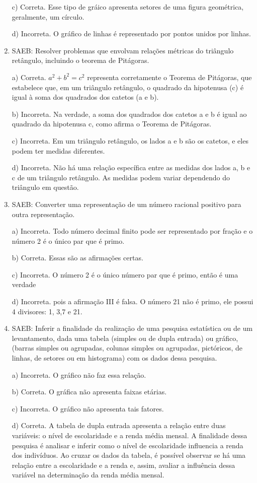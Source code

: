 \begin{enumerate}
c) Correta. Esse tipo de gráico apresenta setores de uma figura
geométrica, geralmente, um círculo.

d) Incorreta. O gráfico de linhas é representado por pontos unidos
por linhas.

\item SAEB: Resolver problemas que envolvam relações métricas do triângulo
retângulo, incluindo o teorema de Pitágoras.

a) Correta. $a^2 + b^2 = c^2$ representa corretamente o Teorema de
Pitágoras, que estabelece que, em um triângulo retângulo, o quadrado da
hipotenusa (c) é igual à soma dos quadrados dos catetos (a e b).

b) Incorreta. Na verdade, a soma dos quadrados dos catetos a e b é
igual ao quadrado da hipotenusa c, como afirma o Teorema de Pitágoras.

c) Incorreta. Em um triângulo retângulo, os lados a e b são os
catetos, e eles podem ter medidas diferentes.

d) Incorreta. Não há uma relação específica entre as medidas dos
lados a, b e c de um triângulo retângulo. As medidas podem variar
dependendo do triângulo em questão.

\item SAEB: Converter uma representação de um número racional positivo para
outra representação.

a) Incorreta. Todo número decimal finito pode ser representado por
fração e o número 2 é o único par que é primo.

b) Correta. Essas são as afirmações certas.

c) Incorreta. O número 2 é o único número par que é primo, então é
uma verdade

d) Incorreta. pois a afirmação III é falsa. O número 21 não é primo, ele
possui 4 divisores: 1, 3,7 e 21.

\item SAEB: Inferir a finalidade da realização de uma pesquisa estatística ou
de um levantamento, dada uma tabela (simples ou de dupla entrada) ou
gráfico, (barras simples ou agrupadas, colunas simples ou agrupadas,
pictóricos, de linhas, de setores ou em histograma) com os dados dessa
pesquisa.

a) Incorreta. O gráfico não faz essa relação.

b) Correta. O gráfica não apresenta faixas etárias.

c) Incorreta. O gráfico não apresenta tais fatores.

d) Correta. A tabela de dupla entrada apresenta a relação entre
duas variáveis: o nível de escolaridade e a renda média mensal. A
finalidade dessa pesquisa é analisar e inferir como o nível de
escolaridade influencia a renda dos indivíduos. Ao cruzar os dados da
tabela, é possível observar se há uma relação entre a escolaridade e a
renda e, assim, avaliar a influência dessa variável na determinação da
renda média mensal.


\end{enumerate}

